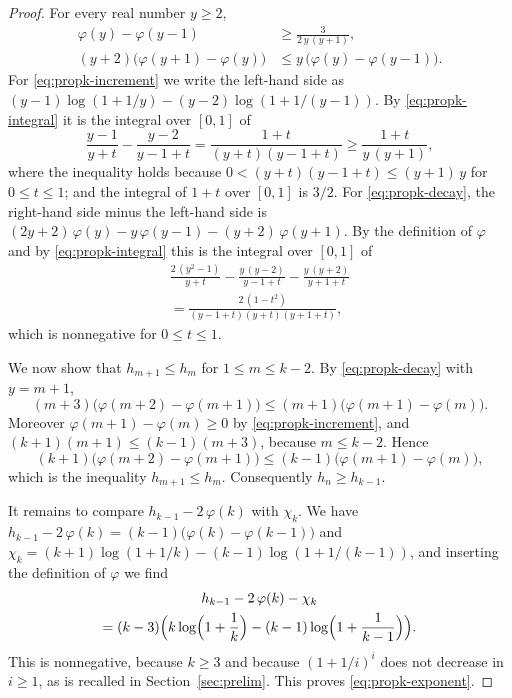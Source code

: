\documentclass{amsart}
\theoremstyle{definition}
\theoremstyle{remark}
\numberwithin{equation}{section}
\begin{document}
\begin{proof}
For every real number $y\ge2$,
\begin{align}
\varphi(y)-\varphi(y-1)&\ge\frac{3}{2\,y\,(y+1)},
\label{eq:propk-increment}\\
(y+2)\bigl(\varphi(y+1)-\varphi(y)\bigr)
&\le y\,\bigl(\varphi(y)-\varphi(y-1)\bigr).
\label{eq:propk-decay}
\end{align}
For \eqref{eq:propk-increment} we write the left-hand side as
$(y-1)\log(1+1/y)-(y-2)\log(1+1/(y-1))$. By \eqref{eq:propk-integral} it is
the integral over $[0,1]$ of
\[
\frac{y-1}{y+t}-\frac{y-2}{y-1+t}=\frac{1+t}{(y+t)(y-1+t)}
\ge\frac{1+t}{y\,(y+1)},
\]
where the inequality holds because $0<(y+t)(y-1+t)\le(y+1)\,y$ for
$0\le t\le1$; and the integral of $1+t$ over $[0,1]$ is $3/2$. For
\eqref{eq:propk-decay}, the right-hand side minus the left-hand side is
$(2y+2)\,\varphi(y)-y\,\varphi(y-1)-(y+2)\,\varphi(y+1)$. By the definition
of $\varphi$ and by \eqref{eq:propk-integral} this is the integral over
$[0,1]$ of
\begin{multline*}
\frac{2\,(y^2-1)}{y+t}-\frac{y\,(y-2)}{y-1+t}-\frac{y\,(y+2)}{y+1+t}\\
=\frac{2\,(1-t^2)}{(y-1+t)(y+t)(y+1+t)},
\end{multline*}
which is nonnegative for $0\le t\le1$.

We now show that $h_{m+1}\le h_m$ for $1\le m\le k-2$. By
\eqref{eq:propk-decay} with $y=m+1$,
\[
(m+3)\bigl(\varphi(m+2)-\varphi(m+1)\bigr)
\le(m+1)\bigl(\varphi(m+1)-\varphi(m)\bigr).
\]
Moreover $\varphi(m+1)-\varphi(m)\ge0$ by \eqref{eq:propk-increment}, and
$(k+1)(m+1)\le(k-1)(m+3)$, because $m\le k-2$. Hence
\[
(k+1)\bigl(\varphi(m+2)-\varphi(m+1)\bigr)
\le(k-1)\bigl(\varphi(m+1)-\varphi(m)\bigr),
\]
which is the inequality $h_{m+1}\le h_m$. Consequently $h_n\ge h_{k-1}$.

It remains to compare $h_{k-1}-2\,\varphi(k)$ with $\chi_k$. We have
$h_{k-1}-2\,\varphi(k)=(k-1)\bigl(\varphi(k)-\varphi(k-1)\bigr)$ and
$\chi_k=(k+1)\log(1+1/k)-(k-1)\log(1+1/(k-1))$, and inserting the
definition of $\varphi$ we find
\begin{multline*}
h_{k-1}-2\,\varphi(k)-\chi_k\\
=(k-3)\Bigl(k\log\Bigl(1+\frac1k\Bigr)
-(k-1)\log\Bigl(1+\frac1{k-1}\Bigr)\Bigr).
\end{multline*}
This is nonnegative, because $k\ge3$ and because $(1+1/i)^{i}$ does not
decrease in $i\ge1$, as is recalled in Section~\ref{sec:prelim}. This
proves \eqref{eq:propk-exponent}.
\end{proof}
\end{document}
